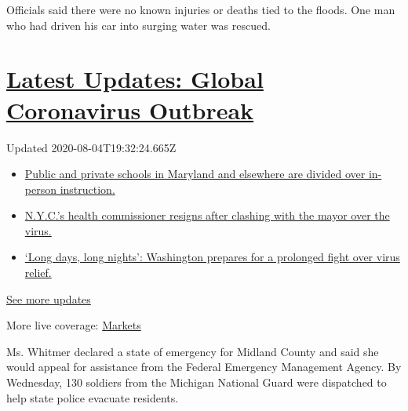 Officials said there were no known injuries or deaths tied to the
floods. One man who had driven his car into surging water was rescued.

\hypertarget{latest-updates-global-coronavirus-outbreak}{%
\section{\texorpdfstring{\href{https://www.nytimes3xbfgragh.onion/2020/08/04/world/coronavirus-cases.html?action=click\&pgtype=Article\&state=default\&region=MAIN_CONTENT_1\&context=storylines_live_updates}{Latest
Updates: Global Coronavirus
Outbreak}}{Latest Updates: Global Coronavirus Outbreak}}\label{latest-updates-global-coronavirus-outbreak}}

Updated 2020-08-04T19:32:24.665Z

\begin{itemize}
\tightlist
\item
  \href{https://www.nytimes3xbfgragh.onion/2020/08/04/world/coronavirus-cases.html?action=click\&pgtype=Article\&state=default\&region=MAIN_CONTENT_1\&context=storylines_live_updates\#link-4825b93}{Public
  and private schools in Maryland and elsewhere are divided over
  in-person instruction.}
\item
  \href{https://www.nytimes3xbfgragh.onion/2020/08/04/world/coronavirus-cases.html?action=click\&pgtype=Article\&state=default\&region=MAIN_CONTENT_1\&context=storylines_live_updates\#link-4d1eafa8}{N.Y.C.'s
  health commissioner resigns after clashing with the mayor over the
  virus.}
\item
  \href{https://www.nytimes3xbfgragh.onion/2020/08/04/world/coronavirus-cases.html?action=click\&pgtype=Article\&state=default\&region=MAIN_CONTENT_1\&context=storylines_live_updates\#link-6b644638}{`Long
  days, long nights': Washington prepares for a prolonged fight over
  virus relief.}
\end{itemize}

\href{https://www.nytimes3xbfgragh.onion/2020/08/04/world/coronavirus-cases.html?action=click\&pgtype=Article\&state=default\&region=MAIN_CONTENT_1\&context=storylines_live_updates}{See
more updates}

More live coverage:
\href{https://www.nytimes3xbfgragh.onion/live/2020/08/04/business/stock-market-today-coronavirus?action=click\&pgtype=Article\&state=default\&region=MAIN_CONTENT_1\&context=storylines_live_updates}{Markets}

Ms. Whitmer declared a state of emergency for Midland County and said
she would appeal for assistance from the Federal Emergency Management
Agency. By Wednesday, 130 soldiers from the Michigan National Guard were
dispatched to help state police evacuate residents.

